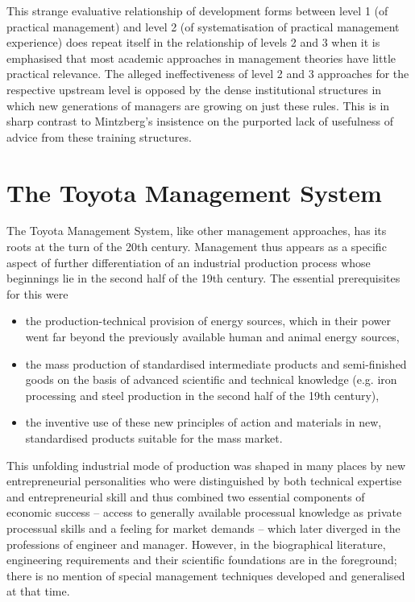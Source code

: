 \documentclass[11pt,a4paper]{article}
\begin{document}
This strange evaluative relationship of development forms between level 1 (of
practical management) and level 2 (of systematisation of practical management
experience) does repeat itself in the relationship of levels 2 and 3 when it
is emphasised that most academic approaches in management theories have little
practical relevance. The alleged ineffectiveness of level 2 and 3 approaches
for the respective upstream level is opposed by the dense institutional
structures in which new generations of managers are growing on just these
rules. This is in sharp contrast to Mintzberg's insistence on the purported
lack of usefulness of advice from these training structures.

\section{The Toyota Management System}

The Toyota Management System, like other management approaches, has its roots
at the turn of the 20th century. Management thus appears as a specific aspect
of further differentiation of an industrial production process whose
beginnings lie in the second half of the 19th century. The essential
prerequisites for this were
\begin{itemize}
\item the production-technical provision of energy sources, which in their
  power went far beyond the previously available human and animal energy
  sources,
\item the mass production of standardised intermediate products and
  semi-finished goods on the basis of advanced scientific and technical
  knowledge (e.g. iron processing and steel production in the second half of
  the 19th century),
\item the inventive use of these new principles of action and materials in
  new, standardised products suitable for the mass market.
\end{itemize}
This unfolding industrial mode of production was shaped in many places by new
entrepreneu\-rial personalities who were distinguished by both technical
expertise and entrepreneurial skill and thus combined two essential components
of economic success -- access to generally available processual knowledge as
private processual skills and a feeling for market demands -- which later
diverged in the professions of engineer and manager. However, in the
biographical literature, engineering requirements and their scientific
foundations are in the foreground; there is no mention of special management
techniques developed and generalised at that time.
\end{document}
